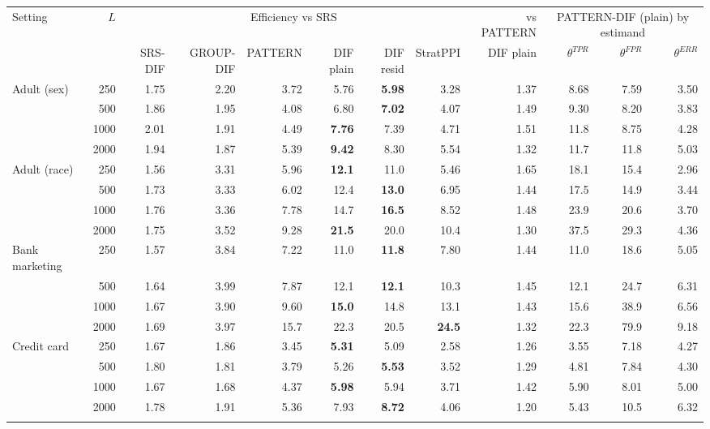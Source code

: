 \begin{tabular}{lrrrrrrrr rrr}\toprule
Setting & $L$ & \multicolumn{6}{c}{Efficiency vs SRS} & vs PATTERN & \multicolumn{3}{c}{PATTERN-DIF (plain) by estimand} \\
 & & SRS-DIF & GROUP-DIF & PATTERN & DIF plain & DIF resid & StratPPI & DIF plain & $\theta^{TPR}$ & $\theta^{FPR}$ & $\theta^{ERR}$ \\\midrule
Adult (sex) & 250 & 1.75 & 2.20 & 3.72 & 5.76 & \textbf{5.98} & 3.28 & 1.37 & 8.68 & 7.59 & 3.50 \\
 & 500 & 1.86 & 1.95 & 4.08 & 6.80 & \textbf{7.02} & 4.07 & 1.49 & 9.30 & 8.20 & 3.83 \\
 & 1000 & 2.01 & 1.91 & 4.49 & \textbf{7.76} & 7.39 & 4.71 & 1.51 & 11.8 & 8.75 & 4.28 \\
 & 2000 & 1.94 & 1.87 & 5.39 & \textbf{9.42} & 8.30 & 5.54 & 1.32 & 11.7 & 11.8 & 5.03 \\
\addlinespace
Adult (race) & 250 & 1.56 & 3.31 & 5.96 & \textbf{12.1} & 11.0 & 5.46 & 1.65 & 18.1 & 15.4 & 2.96 \\
 & 500 & 1.73 & 3.33 & 6.02 & 12.4 & \textbf{13.0} & 6.95 & 1.44 & 17.5 & 14.9 & 3.44 \\
 & 1000 & 1.76 & 3.36 & 7.78 & 14.7 & \textbf{16.5} & 8.52 & 1.48 & 23.9 & 20.6 & 3.70 \\
 & 2000 & 1.75 & 3.52 & 9.28 & \textbf{21.5} & 20.0 & 10.4 & 1.30 & 37.5 & 29.3 & 4.36 \\
\addlinespace
Bank marketing & 250 & 1.57 & 3.84 & 7.22 & 11.0 & \textbf{11.8} & 7.80 & 1.44 & 11.0 & 18.6 & 5.05 \\
 & 500 & 1.64 & 3.99 & 7.87 & 12.1 & \textbf{12.1} & 10.3 & 1.45 & 12.1 & 24.7 & 6.31 \\
 & 1000 & 1.67 & 3.90 & 9.60 & \textbf{15.0} & 14.8 & 13.1 & 1.43 & 15.6 & 38.9 & 6.56 \\
 & 2000 & 1.69 & 3.97 & 15.7 & 22.3 & 20.5 & \textbf{24.5} & 1.32 & 22.3 & 79.9 & 9.18 \\
\addlinespace
Credit card & 250 & 1.67 & 1.86 & 3.45 & \textbf{5.31} & 5.09 & 2.58 & 1.26 & 3.55 & 7.18 & 4.27 \\
 & 500 & 1.80 & 1.81 & 3.79 & 5.26 & \textbf{5.53} & 3.52 & 1.29 & 4.81 & 7.84 & 4.30 \\
 & 1000 & 1.67 & 1.68 & 4.37 & \textbf{5.98} & 5.94 & 3.71 & 1.42 & 5.90 & 8.01 & 5.00 \\
 & 2000 & 1.78 & 1.91 & 5.36 & 7.93 & \textbf{8.72} & 4.06 & 1.20 & 5.43 & 10.5 & 6.32 \\
\addlinespace

\end{tabular}
